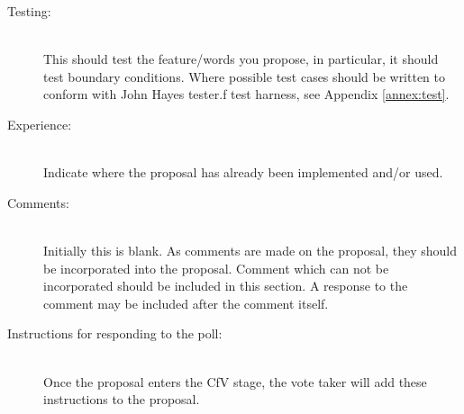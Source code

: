 \begin{description}
\item[Testing:] ~\\
	This should test the feature/words you propose, in particular, it
	should test boundary conditions.  Where possible test cases should
	be written to conform with John Hayes tester.f test harness, see
	Appendix \ref{annex:test}.

\item[Experience:] ~\\
	Indicate where the proposal has already been implemented and/or
	used.

\item[Comments:] ~\\
	Initially this is blank.  As comments are made on the proposal,
	they should be incorporated into the proposal.  Comment which can
	not be incorporated should be included in this section.  A response
	to the comment may be included after the comment itself.

\item[Instructions for responding to the poll:] ~\\
	Once the proposal enters the CfV stage, the vote taker will add
	these instructions to the proposal.
\end{description}
